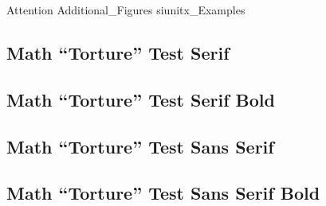 \documentclass[a4paper, 10pt]{article}
\begin{document}
\begin{appendices}
	\label{sec:appendix}
	\FloatBarrier
	{Attention}
	\FloatBarrier
	\newpage
	{Additional_Figures}
	\FloatBarrier
	\newpage
	{siunitx_Examples}
	\FloatBarrier
	\newpage
	\iftrue  %
	\begingroup%
		\setlength{\parindent}{0cm}

		

		\newpage
		\renewcommand{\showfamily}{{\color{magenta}%
			Serif%
		}}
		{\rmfamily\mdseries%
		 \subsection{Math ``Torture'' Test \showfamily}
	 	}

		\newpage
		\renewcommand{\showfamily}{{\color{magenta}%
			Serif Bold%
		}}
		{\rmfamily\bfseries%
		 \subsection{Math ``Torture'' Test \showfamily}
		}

		\newpage
		\renewcommand{\showfamily}{{\color{magenta}%
			Sans Serif%
		}}
		{\sffamily\mdseries%
		 \subsection{Math ``Torture'' Test \showfamily}
		}

		\newpage
		\renewcommand{\showfamily}{{\color{magenta}%
			Sans Serif Bold%
		}}
		{\sffamily\bfseries%
		 \subsection{Math ``Torture'' Test \showfamily}
		}%
	\endgroup
	\fi
\end{appendices}

\newpage


\begin{refcontext}[sorting=nyt]  %
\printbibliography[heading=bibintoc]
\end{refcontext}
\end{document}

